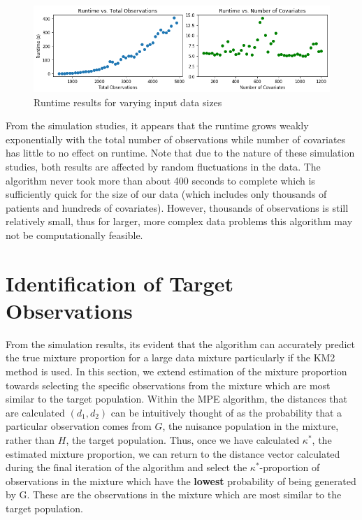 \documentclass[lineno]{biometrika}
\begin{document}
\begin{figure}[h]
\includegraphics[width=1\linewidth]{art/runtime_results.png}
\caption{Runtime results for varying input data sizes}
\label{fig3}
\end{figure} 

From the simulation studies, it appears that the runtime grows weakly exponentially with the total number of observations while number of covariates has little to no effect on runtime. Note that due to the nature of these simulation studies, both results are affected by random fluctuations in the data. The algorithm never took more than about 400 seconds to complete which is sufficiently quick for the size of our data (which includes only thousands of patients and hundreds of covariates). However, thousands of observations is still relatively small, thus for larger, more complex data problems this algorithm may not be computationally feasible.

\section{Identification of Target Observations}
From the simulation results, its evident that the algorithm can accurately predict the true mixture proportion for a large data mixture particularly if the KM2 method is used. In this section, we extend estimation of the mixture proportion towards selecting the specific observations from the mixture which are most similar to the target population. Within the MPE algorithm, the distances that are calculated $(d_1, d_2)$ can be intuitively thought of as the probability that a particular observation comes from $G$, the nuisance population in the mixture, rather than $H$, the target population. Thus, once we have calculated $\kappa^*$, the estimated mixture proportion, we can return to the distance vector calculated during the final iteration of the algorithm and select the $\kappa^*$-proportion of observations in the mixture which have the \textbf{lowest} probability of being generated by G. These are the observations in the mixture which are most similar to the target population.
\end{document}
